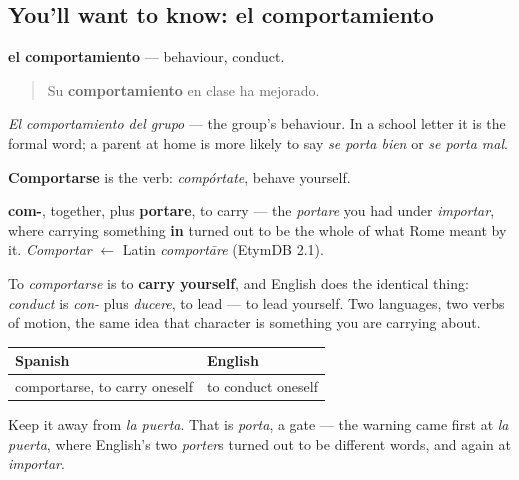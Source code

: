\subsection*{You'll want to know: el comportamiento}
\textbf{el comportamiento} — behaviour, conduct.

\begin{quote}
Su \textbf{comportamiento} en clase ha mejorado.
\end{quote}

\emph{El comportamiento del grupo} — the group's behaviour. In a school letter it is the formal word; a parent at home is more likely to say \emph{se porta bien} or \emph{se porta mal}.

\textbf{Comportarse} is the verb: \emph{compórtate}, behave yourself.

\begin{cousinweb}
\textbf{com-}, together, plus \textbf{portare}, to carry — the \emph{portare} you had under \emph{importar}, where carrying something \textbf{in} turned out to be the whole of what Rome meant by it. \emph{Comportar} $\leftarrow$ Latin \emph{comportāre} (EtymDB 2.1).

To \emph{comportarse} is to \textbf{carry yourself}, and English does the identical thing: \emph{conduct} is \emph{con-} plus \emph{ducere}, to lead — to lead yourself. Two languages, two verbs of motion, the same idea that character is something you are carrying about.

\noindent
\begin{tabularx}{\linewidth}{@{}>{\raggedright\arraybackslash}X>{\raggedright\arraybackslash}X@{}}
\toprule
\textbf{Spanish} & \textbf{English} \\
\midrule
comportarse, to carry oneself & to conduct oneself \\
\bottomrule
\end{tabularx}

Keep it away from \emph{la puerta}. That is \emph{porta}, a gate — the warning came first at \emph{la puerta}, where English's two \emph{porter}s turned out to be different words, and again at \emph{importar}.
\end{cousinweb}

